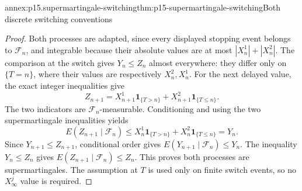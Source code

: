 \begin{annexitem}{annex:p15.supermartingale-switching}{thm:p15-supermartingale-switching}{Both discrete switching conventions}
\begin{proof}
Both processes are adapted, since every displayed stopping
event belongs to \(\mathcal F_n\), and integrable because
their absolute values are at most \(|X^1_n|+|X^2_n|\).
The comparison at the switch gives \(Y_n\leq Z_n\) almost
everywhere: they differ only on \(\{T=n\}\), where their
values are respectively \(X^2_n,X^1_n\).
For the next delayed value, the exact integer inequalities give
\[
        Z_{n+1}=X^1_{n+1}\mathbf1_{\{T>n\}}
                         +X^2_{n+1}\mathbf1_{\{T\leq n\}}.
\]
The two indicators are \(\mathcal F_n\)-measurable.
Conditioning and using the two supermartingale inequalities yields
\[
                    E(Z_{n+1}\mid\mathcal F_n)
                       \leq X^1_n\mathbf1_{\{T>n\}}
                              +X^2_n\mathbf1_{\{T\leq n\}}=Y_n.
\]
Since \(Y_{n+1}\leq Z_{n+1}\), conditional order gives
\(E(Y_{n+1}\mid\mathcal F_n)\leq Y_n\).
The inequality \(Y_n\leq Z_n\) gives
\(E(Z_{n+1}\mid\mathcal F_n)\leq Z_n\).
This proves both processes are supermartingales.
The assumption at \(T\) is used only on finite switch events,
so no \(X^j_\infty\) value is required.
\end{proof}
\end{annexitem}

